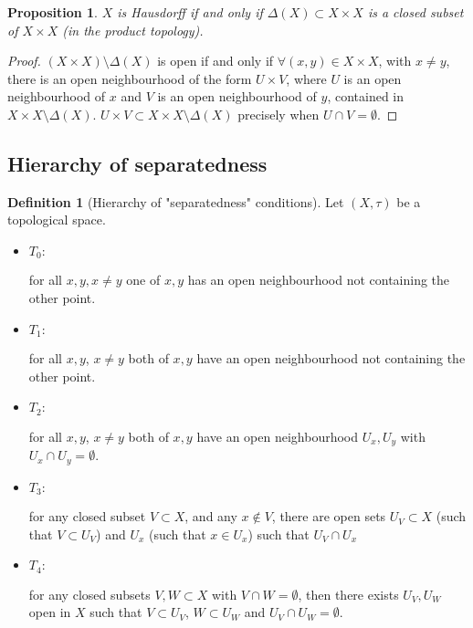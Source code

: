 \documentclass{article}
\theoremstyle{definition}
\newtheorem{defn}{Definition}[section]
\theoremstyle{plain}%
\newtheorem{prop}[thm]{Proposition}
\theoremstyle{remark}
\newcommand{\intersection}{\cap}
\begin{document}
\begin{prop}\label{Diagonal close in Haus}
    $X$ is Hausdorff if and only if $\Delta(X) \subset X \times X$ is a closed subset of $X \times X$ (in the product topology).
\end{prop}

\begin{proof}
    $(X \times X) \setminus \Delta(X)$ is open if and only if $\forall (x,y) \in X \times X$, with $x \ne y$, there is an open neighbourhood of the form $U \times V$, where $U$ is an open neighbourhood of $x$ and $V$ is an open neighbourhood of $y$, contained in $X \times X \setminus \Delta(X)$. $U \times V \subset X \times X \setminus \Delta(X)$ precisely when $U \intersection V = \emptyset$.
\end{proof}

\subsection{Hierarchy of separatedness}

\begin{defn}[Hierarchy of "separatedness" conditions]
    Let $(X, \tau)$ be a topological space.
    \begin{itemize}
        \item $T_0:$
        
        for all $x,y, x \ne y$ one of $x,y$ has an open neighbourhood not containing the other point.
        \item $T_1:$
        
        for all $x,y$, $x \ne y$ both of $x,y$ have an open neighbourhood not containing the other point.
        \item $T_2:$
        
        for all $x,y$, $x \ne y$ both of $x,y$ have an open neighbourhood $U_x, U_y$ with $U_x \intersection U_y = \emptyset$.
        \item $T_3:$
        
        for any closed subset $V \subset X$, and any $x \not\in V$, there are open sets $U_V \subset X$ (such that $V \subset U_V$) and $U_x$ (such that $x \in U_x$) such that $U_V \intersection U_x$
        \item $T_4:$
        
        for any closed subsets $V, W \subset X$ with $V \intersection W = \emptyset$, then there exists $U_V, U_W$ open in $X$ such that $V \subset U_V$, $W \subset U_W$ and $U_V \intersection U_W = \emptyset$.
    \end{itemize}
\end{defn}
\end{document}
